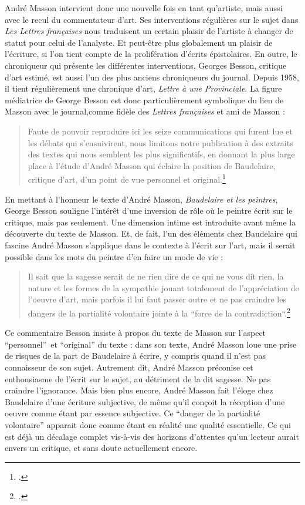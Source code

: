 	 André Masson intervient donc une nouvelle fois en tant qu’artiste, mais aussi avec le recul du commentateur d’art. Ses interventions régulières sur le sujet dans \emph{Les Lettres françaises} nous traduisent un certain plaisir de l’artiste à changer de statut pour celui de l’analyste. Et peut-être plus globalement un plaisir de l’écriture, si l’on tient compte de la prolifération d’écrits épistolaires. En outre, le chroniqueur qui présente les différentes interventions, Georges Besson, critique d’art estimé, est aussi l’un des plus anciens chroniqueurs du journal. Depuis 1958, il tient régulièrement une chronique d’art, \emph{Lettre à une Provinciale}. La figure médiatrice de George Besson est donc particulièrement symbolique du lien de Masson avec le journal,comme fidèle des \emph{Lettres françaises} et ami de Masson :
\begin{quote}
Faute de pouvoir reproduire ici les seize communications qui furent lue et les débats qui s’ensuivirent, nous limitons notre publication à des extraits des textes qui nous semblent les plus significatifs, en donnant la plus large place à l’étude d’André Masson qui éclaire la position de Baudelaire, critique d’art, d’un point de vue personnel et original.\footcite{baudelairepeintres}\end{quote}

	En mettant à l’honneur le texte d’André Masson, \emph{Baudelaire et les peintres}, George Besson souligne l’intérêt d’une inversion de rôle où le peintre écrit sur le critique, mais pas seulement. Une dimension intime est introduite avant même la découverte du texte de Masson. Et, de fait, l’un des éléments chez Baudelaire qui fascine André Masson s’applique dans le contexte à l’écrit sur l’art, mais il serait possible dans les mots du peintre d’en faire un mode de vie : 
\begin{quote}
Il sait que la sagesse serait de ne rien dire de ce qui ne vous dit rien, la nature et les formes de la sympathie jouant totalement de l’appréciation de l’oeuvre d’art, mais parfois il lui faut passer outre et ne pas craindre les dangers de la partialité volontaire jointe à la “force de la contradiction“.\footcite{baudelairepeintres}\end{quote}

Ce commentaire Besson insiste à propos du texte de Masson sur l’aspect \enquote{personnel} et \enquote{original} du texte : dans son texte, André Masson loue une prise de risques de la part de Baudelaire à écrire, y compris quand il n’est pas connaisseur de son sujet. Autrement dit, André Masson préconise cet enthousiasme de l’écrit sur le sujet, au détriment de la dit sagesse. Ne pas craindre l’ignorance. Mais bien plus encore, André Masson fait l’éloge chez Baudelaire d’une écriture subjective, de même qu’il conçoit la réception d’une oeuvre comme étant par essence subjective. Ce \enquote{danger de la partialité volontaire} apparait donc comme étant en réalité une qualité essentielle. Ce qui est déjà un décalage complet vis-à-vis des horizons d’attentes qu’un lecteur aurait envers un critique, et sans doute actuellement encore. 

